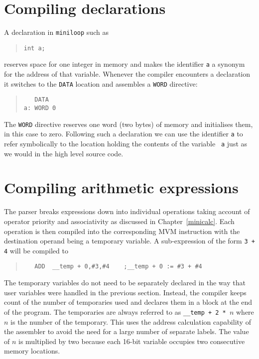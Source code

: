 \section{Compiling declarations}
A declaration in {\tt miniloop} such as
\begin{quote}
\verb+int a;+
\end{quote}
reserves space for one integer in memory and makes the identifier {\tt a} a synonym for
the address of that variable. Whenever the compiler encounters a declaration it switches to 
the {\tt DATA} location and assembles a {\tt WORD} directive:
\begin{quote}
\small
\begin{verbatim}
   DATA
a: WORD 0
\end{verbatim}
\end{quote}
The {\tt WORD} directive reserves one word (two bytes) of memory and initialises them, in
this case to zero.
Following such a declaration we can use the identifier {\tt a} to refer
symbolically to the location holding the contents of the variable {\tt
a} just as we would in the high level source code.

\section{Compiling arithmetic expressions}
\label{expressions}

The parser breaks expressions down into individual operations taking
account of operator priority and associativity as discussed in
Chapter~\ref{minicalc}. Each operation is then compiled into the corresponding
MVM instruction with the destination operand being a temporary variable. A sub-expression
of the form \verb|3 + 4| will be compiled to
\begin{quote}
\small
\begin{verbatim}
   ADD  __temp + 0,#3,#4    ;__temp + 0 := #3 + #4
\end{verbatim}
\end{quote}
The temporary variables do not need to be separately declared in the way
that user variables were handled in the previous section. Instead, the
compiler keeps count of the number of temporaries used and declares them
in a block at the end of the program. The temporaries are always referred to as
\verb|__temp + 2 * |$n$ where $n$ is the number of the temporary. This uses the address
calculation capability of the assembler to avoid the need for a large number of 
separate labels. The value of $n$ is multiplied by two because each 16-bit variable occupies two
consecutive memory locations.

